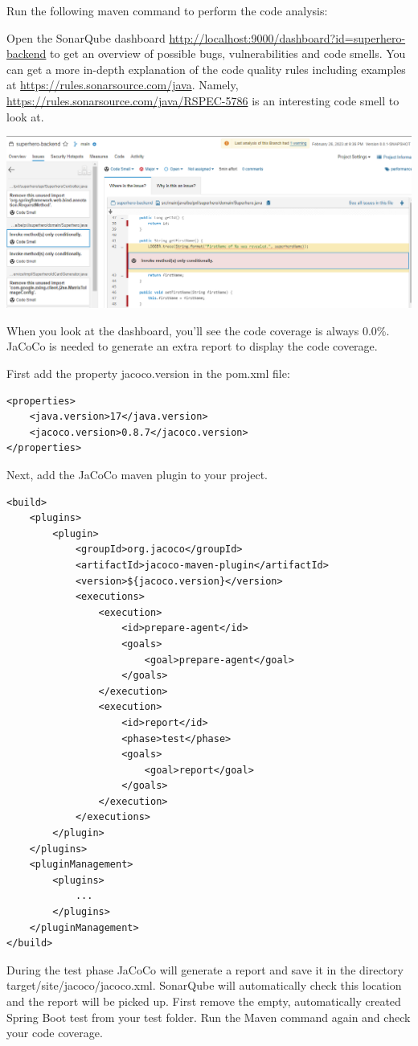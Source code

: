 \begin{oefening}
Run the following maven command to perform the code analysis:

\vspace{5mm}

Open the SonarQube dashboard \url{http://localhost:9000/dashboard?id=superhero-backend} to get an overview of possible bugs, vulnerabilities and code smells.
You can get a more in-depth explanation of the code quality rules including examples at \url{https://rules.sonarsource.com/java}. Namely, \url{https://rules.sonarsource.com/java/RSPEC-5786} is an interesting code smell to look at.

\vspace{5mm}

\includegraphics[width=\textwidth]{./images/chapter3/sonarqube.png}

When you look at the dashboard, you'll see the code coverage is always 0.0\%. JaCoCo is needed to generate an extra report to display the code coverage.

First add the property jacoco.version in the pom.xml file:

\begin{lstlisting}
<properties>
	<java.version>17</java.version>
	<jacoco.version>0.8.7</jacoco.version>
</properties>
\end{lstlisting}

Next, add the JaCoCo maven plugin to your project.

\begin{lstlisting}
<build>
	<plugins>
		<plugin>
			<groupId>org.jacoco</groupId>
			<artifactId>jacoco-maven-plugin</artifactId>
			<version>${jacoco.version}</version>
			<executions>
				<execution>
					<id>prepare-agent</id>
					<goals>
						<goal>prepare-agent</goal>
					</goals>
				</execution>
				<execution>
					<id>report</id>
					<phase>test</phase>
					<goals>
						<goal>report</goal>
					</goals>
				</execution>
			</executions>
		</plugin>
	</plugins>
	<pluginManagement>
		<plugins>
			...
		</plugins>
	</pluginManagement>
</build>
\end{lstlisting}

During the test phase JaCoCo will generate a report and save it in the directory target/site/jacoco/jacoco.xml. SonarQube will automatically check this location and the report will be picked up.
First remove the empty, automatically created Spring Boot test from your test folder.
Run the Maven command again and check your code coverage.

\end{oefening}

